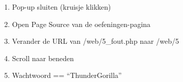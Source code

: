 \begin{enumerate}
  \item Pop-up sluiten (kruisje klikken)
  \item Open Page Source van de oefeningen-pagina
  \item Verander de URL van /web/5\_fout.php naar /web/5
  \item Scroll naar beneden
  \item Wachtwoord == ``ThunderGorilla''
\end{enumerate}